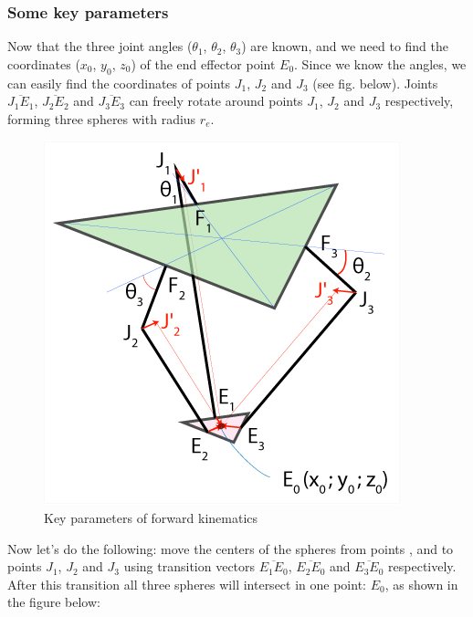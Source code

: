 \subsubsection{Some key parameters}

Now that the three joint angles ($\theta_{1}$, $\theta_{2}$, $\theta_{3}$) are known, and we need to find the coordinates ($x_{0}$, $y_{0}$, $z_{0}$) of the end effector point $E_{0}$.
Since we know the angles, we can easily find the coordinates of points $J_{1}$, $J_{2}$ and $J_{3}$ (see fig. below).
Joints $\overline{J_{1}E_{1}}$, $\overline{J_{2}E_{2}}$ and $\overline{J_{3}E_{3}}$ can freely rotate around points $J_{1}$, $J_{2}$ and $J_{3}$ respectively, forming three spheres with radius $r_{e}$.
\begin{figure}[H]
	\centering
	\includegraphics[width=\maxwidth{10cm}, keepaspectratio]{Chapters/Fig/forward_kinematics_key_parameters.png}
	\caption{Key parameters of forward kinematics}
	\label{fig:forward_kinematics_key_parameters}
\end{figure}
Now let's do the following: move the centers of the spheres from points , and to points $J_{1}$, $J_{2}$ and $J_{3}$ using transition vectors $\overline{E_{1}E_{0}}$, $\overline{E_{2}E_{0}}$ and $\overline{E_{3}E_{0}}$ respectively. After this transition all three spheres will
intersect in one point: $E_{0}$, as shown in the figure below:
